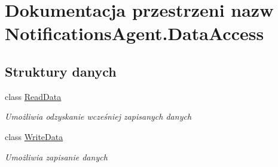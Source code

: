 \hypertarget{a00296}{}\section{Dokumentacja przestrzeni nazw Notifications\+Agent.\+Data\+Access}
\label{a00296}
\subsection*{Struktury danych}
\begin{DoxyCompactItemize}
\item 
class \hyperlink{a00046}{Read\+Data}
\begin{DoxyCompactList}\small\item\em Umożliwia odzyskanie wcześniej zapisanych danych \end{DoxyCompactList}\item 
class \hyperlink{a00089}{Write\+Data}
\begin{DoxyCompactList}\small\item\em Umożliwia zapisanie danych \end{DoxyCompactList}\end{DoxyCompactItemize}
